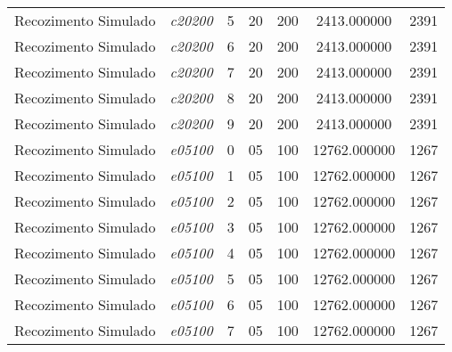 {\begin{longtable}{cc|c|cc|cc}
			Recozimento Simulado & \textit{c20200}    & 5                               & 20               & 200              & 2413.000000                          & 2391 \\ 
			Recozimento Simulado & \textit{c20200}    & 6                               & 20               & 200              & 2413.000000                          & 2391 \\ 
			Recozimento Simulado & \textit{c20200}    & 7                               & 20               & 200              & 2413.000000                          & 2391 \\ 
			Recozimento Simulado & \textit{c20200}    & 8                               & 20               & 200              & 2413.000000                          & 2391 \\ 
			Recozimento Simulado & \textit{c20200}    & 9                               & 20               & 200              & 2413.000000                          & 2391 \\ \hline
			Recozimento Simulado & \textit{e05100}    & 0                               & 05               & 100              & 12762.000000                          & 1267 \\ 
			Recozimento Simulado & \textit{e05100}    & 1                               & 05               & 100              & 12762.000000                          & 1267 \\ 
			Recozimento Simulado & \textit{e05100}    & 2                               & 05               & 100              & 12762.000000                          & 1267 \\ 
			Recozimento Simulado & \textit{e05100}    & 3                               & 05               & 100              & 12762.000000                          & 1267 \\ 
			Recozimento Simulado & \textit{e05100}    & 4                               & 05               & 100              & 12762.000000                          & 1267 \\ 
			Recozimento Simulado & \textit{e05100}    & 5                               & 05               & 100              & 12762.000000                          & 1267 \\ 
			Recozimento Simulado & \textit{e05100}    & 6                               & 05               & 100              & 12762.000000                          & 1267 \\ 
			Recozimento Simulado & \textit{e05100}    & 7                               & 05               & 100              & 12762.000000                          & 1267 \\ 

\end{longtable}}
